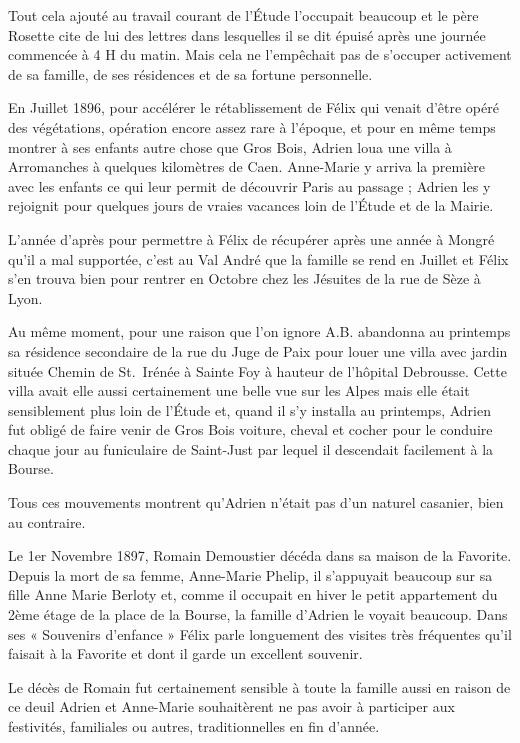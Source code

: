 \documentclass[11pt,a4paper]{report}
\begin{document}

Tout cela ajouté au travail courant de l'Étude l'occupait beaucoup et le père Rosette cite de lui des lettres dans lesquelles il se dit épuisé après une journée commencée à 4 H du matin. Mais cela ne l'empêchait pas de s'occuper activement de sa famille, de ses résidences et de sa fortune personnelle.

En Juillet 1896, pour accélérer le rétablissement de Félix qui venait d'être opéré des végétations, opération encore assez rare à l'époque, et pour en même temps montrer à ses enfants autre chose que Gros Bois, Adrien loua une villa à Arromanches à quelques kilomètres de Caen. Anne-Marie y arriva la première avec les enfants ce qui leur permit de découvrir Paris au passage ; Adrien les y rejoignit pour quelques jours de vraies vacances loin de l'Étude et de la Mairie.

L'année d'après pour permettre à Félix de récupérer après une année à Mongré qu'il a mal supportée, c'est au Val André que la famille se rend en Juillet et Félix s'en trouva bien pour rentrer en Octobre chez les Jésuites de la rue de Sèze à Lyon.

Au même moment, pour une raison que l'on ignore A.B. abandonna au printemps sa résidence secondaire de la rue du Juge de Paix pour louer une villa avec jardin située Chemin de St.~Irénée à Sainte Foy à hauteur de l'hôpital Debrousse. Cette villa avait elle aussi certainement une belle vue sur les Alpes mais elle était sensiblement plus loin de l'Étude et, quand il s'y installa au printemps, Adrien fut obligé de faire venir de Gros Bois voiture, cheval et cocher pour le conduire chaque jour au funiculaire de Saint-Just par lequel il descendait facilement à la Bourse.

Tous ces mouvements montrent qu'Adrien n'était pas d'un naturel casanier, bien au contraire.

Le 1er Novembre 1897, Romain Demoustier décéda dans sa maison de la Favorite. Depuis la mort de sa femme, Anne-Marie Phelip, il s'appuyait beaucoup sur sa fille Anne Marie Berloty et, comme il occupait en hiver le petit appartement du 2ème étage de la place de la Bourse, la famille d'Adrien le voyait beaucoup. Dans ses « Souvenirs d'enfance » Félix parle longuement des visites très fréquentes qu'il faisait à la Favorite et dont il garde un excellent souvenir.

Le décès de Romain fut certainement sensible à toute la famille aussi en raison de ce deuil Adrien et Anne-Marie souhaitèrent ne pas avoir à participer aux festivités, familiales ou autres, traditionnelles en fin d'année.
\end{document}
